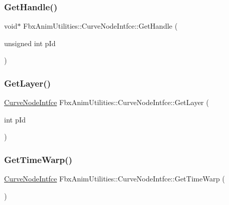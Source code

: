 \subsubsection{\texorpdfstring{Get\+Handle()}{GetHandle()}\hspace{0.1cm}{\footnotesize\ttfamily [2/2]}}
{\footnotesize\ttfamily void$\ast$ Fbx\+Anim\+Utilities\+::\+Curve\+Node\+Intfce\+::\+Get\+Handle (\begin{DoxyParamCaption}\item[{unsigned int}]{p\+Id }\end{DoxyParamCaption})}

\mbox{\label{class_fbx_anim_utilities_1_1_curve_node_intfce_a19ff23646e1a540dfcd92be5c564df51}} 
\subsubsection{\texorpdfstring{Get\+Layer()}{GetLayer()}}
{\footnotesize\ttfamily \hyperlink{class_fbx_anim_utilities_1_1_curve_node_intfce}{Curve\+Node\+Intfce} Fbx\+Anim\+Utilities\+::\+Curve\+Node\+Intfce\+::\+Get\+Layer (\begin{DoxyParamCaption}\item[{int}]{p\+Id }\end{DoxyParamCaption})}

\mbox{\label{class_fbx_anim_utilities_1_1_curve_node_intfce_a74183442c98ffd57b606ca7757cde024}} 
\subsubsection{\texorpdfstring{Get\+Time\+Warp()}{GetTimeWarp()}}
{\footnotesize\ttfamily \hyperlink{class_fbx_anim_utilities_1_1_curve_node_intfce}{Curve\+Node\+Intfce} Fbx\+Anim\+Utilities\+::\+Curve\+Node\+Intfce\+::\+Get\+Time\+Warp (\begin{DoxyParamCaption}{ }\end{DoxyParamCaption})}


